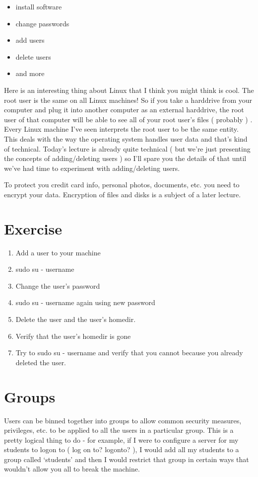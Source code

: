 \documentclass[10pt]{article}
\begin{document}
\begin{itemize}
\item install software
\item change passwords
\item add users
\item delete users
\item and more
\end{itemize}

Here is an interesting thing about Linux that I think you might think is cool. The root user is the same on all Linux machines! So if you take a harddrive from your computer and plug it into another computer as an external harddrive, the root user of that computer will be able to see all of your root user's files ( probably ) . Every Linux machine I've seen interprets the root user to be the same entity. This deals with the way the operating system handles user data and that's kind of technical. Today's lecture is already quite technical ( but we're just presenting the concepts of adding/deleting users ) so I'll spare you the details of that until we've had time to experiment with adding/deleting users. 

To protect you credit card info, personal photos, documents, etc. you need to encrypt your data. Encryption of files and disks is a subject of a later lecture.

\section{{\color{red} Exercise }}
\begin{enumerate}
\item  Add a user to your machine
\item  sudo su - username
\item  Change the user's password
\item  sudo su - username again using new password
\item  Delete the user and the user's homedir. 
\item  Verify that the user's homedir is gone
\item  Try to sudo su - username and verify that you cannot because you already deleted the user.
\end{enumerate}

\section{Groups}
Users can be binned together into groups to allow common security measures,
privileges, etc. to be applied to all the users in a particular group. This is a
pretty logical thing to do - for example, if I were to configure a server for my
students to logon to ( log on to? logonto? ), I would add all my students to a
group called `students' and then I would restrict that group in certain ways
that wouldn't allow you all to break the machine.
\end{document}
